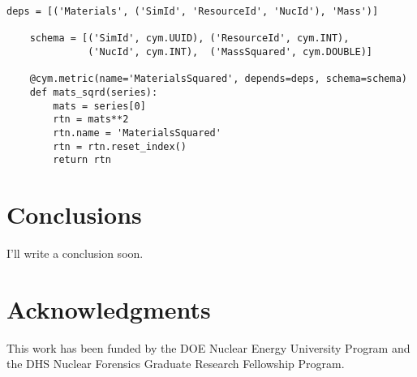 \documentclass{anstrans}
\begin{document}
\begin{lstlisting}[caption ={Writing a Metric in Cymetric}, label=massmetric]
    deps = [('Materials', ('SimId', 'ResourceId', 'NucId'), 'Mass')]

    schema = [('SimId', cym.UUID), ('ResourceId', cym.INT),
              ('NucId', cym.INT),  ('MassSquared', cym.DOUBLE)]

    @cym.metric(name='MaterialsSquared', depends=deps, schema=schema)
    def mats_sqrd(series):
        mats = series[0]
        rtn = mats**2
        rtn.name = 'MaterialsSquared'
        rtn = rtn.reset_index()
        return rtn
\end{lstlisting}


\section{Conclusions}

I'll write a conclusion soon. 

\section{Acknowledgments}
This work has been funded by the \gls{DOE} Nuclear Energy University Program and the \gls{DHS} Nuclear Forensics Graduate Research Fellowship Program. 

\cite{Lar2008}



\end{document}
